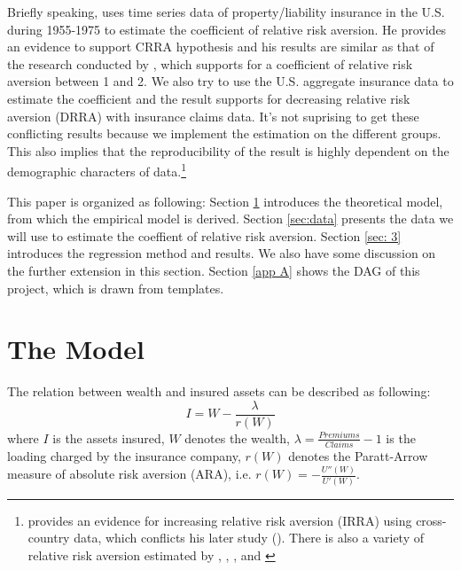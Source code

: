 \documentclass[11pt, a4paper, leqno]{article}
\begin{document}
Briefly speaking, \citet{szpiro1986measuring} uses time series data of property/liability insurance in the U.S. during 1955-1975 to estimate the coefficient of relative risk aversion. He provides an evidence to support CRRA hypothesis and his results are similar as that of the research conducted by \citet{friend1975demand}, which supports for a coefficient of relative risk aversion between 1 and 2. We also try to use the U.S. aggregate insurance data to estimate the coefficient and the result supports for decreasing relative risk aversion (DRRA) with insurance claims data. It's not suprising to get these conflicting results because we implement the estimation on the different groups. This also implies that the reproducibility of the result is highly dependent on the demographic characters of data.\footnote{\citet{szpiro1983hypotheses} provides an evidence for increasing relative risk aversion (IRRA) using cross-country data, which conflicts his later study (\citet{szpiro1986measuring}). There is also a variety of relative risk aversion estimated by \citet{cohn1975individual}, \citet{siegel1982relative}, \citet{hansen1982generalized}, \citet{morin1983risk} and \citet{eisenhauer1999prudence}}

This paper is organized as following: Section \ref{sec:model} introduces the theoretical model, from which the empirical model is derived. Section \ref{sec:data} presents the data we will use to estimate the coeffient of relative risk aversion. Section \ref{sec: 3} introduces the regression method and results. We also have some discussion on the further extension in this section. Section \ref{app A} shows the DAG of this project, which is drawn from \citet{GaudeckerEconProjectTemplates} templates.

\section{The Model}\label{sec:model}

The relation between wealth and insured assets can be described as following:
\begin{equation}\label{eq1}
I = W - \frac{\lambda}{r(W)}
\end{equation}
where $I$ is the assets insured, $W$ denotes the wealth, $\lambda = \frac{Premiums}{Claims} - 1$ is the loading charged by the insurance company, $r(W)$ denotes the Paratt-Arrow measure of absolute risk aversion (ARA), i.e. $r(W) = -\frac{U''(W)}{U'(W)}$.
\end{document}
